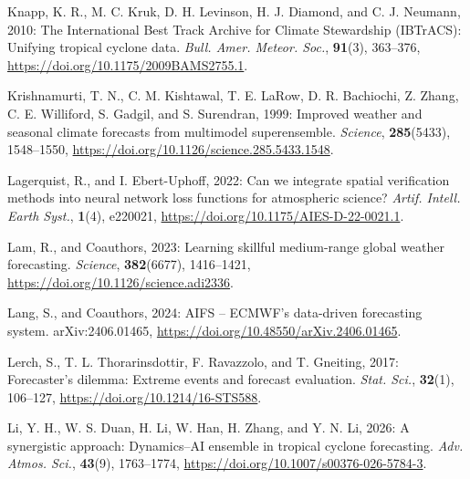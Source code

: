 \documentclass[12pt]{article}
\begin{document}
\begin{Exercises}
\item\hspace*{-6mm}
Knapp, K. R., M. C. Kruk, D. H. Levinson, H. J. Diamond, and C. J. Neumann, 2010: The International Best Track Archive for Climate Stewardship (IBTrACS): Unifying tropical cyclone data. \textit{Bull. Amer. Meteor. Soc.}, \textbf{91}(3), 363--376, \url{https://doi.org/10.1175/2009BAMS2755.1}.

\item\hspace*{-6mm}
Krishnamurti, T. N., C. M. Kishtawal, T. E. LaRow, D. R. Bachiochi, Z. Zhang, C. E. Williford, S. Gadgil, and S. Surendran, 1999: Improved weather and seasonal climate forecasts from multimodel superensemble. \textit{Science}, \textbf{285}(5433), 1548--1550, \url{https://doi.org/10.1126/science.285.5433.1548}.

\item\hspace*{-6mm}
Lagerquist, R., and I. Ebert-Uphoff, 2022: Can we integrate spatial verification methods into neural network loss functions for atmospheric science? \textit{Artif. Intell. Earth Syst.}, \textbf{1}(4), e220021, \url{https://doi.org/10.1175/AIES-D-22-0021.1}.

\item\hspace*{-6mm}
Lam, R., and Coauthors, 2023: Learning skillful medium-range global weather forecasting. \textit{Science}, \textbf{382}(6677), 1416--1421, \url{https://doi.org/10.1126/science.adi2336}.

\item\hspace*{-6mm}
Lang, S., and Coauthors, 2024: AIFS -- ECMWF's data-driven forecasting system. arXiv:2406.01465, \url{https://doi.org/10.48550/arXiv.2406.01465}.

\item\hspace*{-6mm}
Lerch, S., T. L. Thorarinsdottir, F. Ravazzolo, and T. Gneiting, 2017: Forecaster's dilemma: Extreme events and forecast evaluation. \textit{Stat. Sci.}, \textbf{32}(1), 106--127, \url{https://doi.org/10.1214/16-STS588}.

\item\hspace*{-6mm}
Li, Y. H., W. S. Duan, H. Li, W. Han, H. Zhang, and Y. N. Li, 2026: A synergistic approach: Dynamics--AI ensemble in tropical cyclone forecasting. \textit{Adv. Atmos. Sci.}, \textbf{43}(9), 1763--1774, \url{https://doi.org/10.1007/s00376-026-5784-3}.


\end{Exercises}
\end{document}
